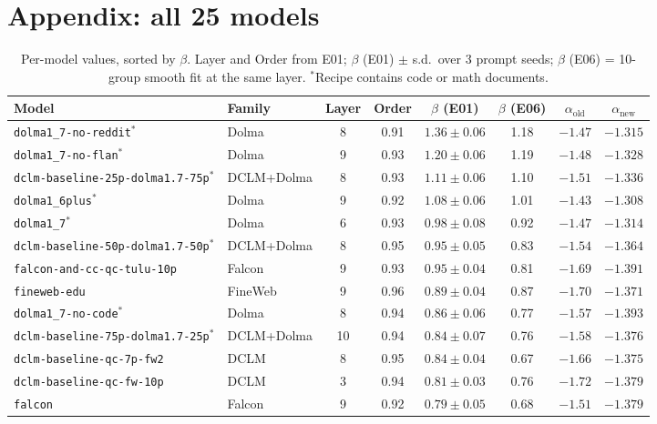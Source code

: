\documentclass[11pt]{article}
\newcommand{\aold}{\alpha_{\text{old}}}
\newcommand{\anew}{\alpha_{\text{new}}}
\begin{document}
\clearpage
\section*{Appendix: all 25 models}

\begin{table}[h]
\centering\footnotesize
\caption{Per-model values, sorted by $\beta$. Layer and Order from E01; $\beta$ (E01) $\pm$ s.d.\ over
3 prompt seeds; $\beta$ (E06) = 10-group smooth fit at the same layer. $^{*}$Recipe contains code or
math documents.}
\label{tab:all}
\begin{tabular}{@{}llcc ccc c@{}}
\toprule
Model & Family & Layer & Order & $\beta$ (E01) & $\beta$ (E06) & $\aold$ & $\anew$ \\
\midrule
\texttt{dolma1\_7-no-reddit$^{*}$} & Dolma & 8 & 0.91 & $1.36\pm0.06$ & 1.18 & $-1.47$ & $-1.315$ \\
\texttt{dolma1\_7-no-flan$^{*}$} & Dolma & 9 & 0.93 & $1.20\pm0.06$ & 1.19 & $-1.48$ & $-1.328$ \\
\texttt{dclm-baseline-25p-dolma1.7-75p$^{*}$} & DCLM+Dolma & 8 & 0.93 & $1.11\pm0.06$ & 1.10 & $-1.51$ & $-1.336$ \\
\texttt{dolma1\_6plus$^{*}$} & Dolma & 9 & 0.92 & $1.08\pm0.06$ & 1.01 & $-1.43$ & $-1.308$ \\
\texttt{dolma1\_7$^{*}$} & Dolma & 6 & 0.93 & $0.98\pm0.08$ & 0.92 & $-1.47$ & $-1.314$ \\
\texttt{dclm-baseline-50p-dolma1.7-50p$^{*}$} & DCLM+Dolma & 8 & 0.95 & $0.95\pm0.05$ & 0.83 & $-1.54$ & $-1.364$ \\
\texttt{falcon-and-cc-qc-tulu-10p} & Falcon & 9 & 0.93 & $0.95\pm0.04$ & 0.81 & $-1.69$ & $-1.391$ \\
\texttt{fineweb-edu} & FineWeb & 9 & 0.96 & $0.89\pm0.04$ & 0.87 & $-1.70$ & $-1.371$ \\
\texttt{dolma1\_7-no-code$^{*}$} & Dolma & 8 & 0.94 & $0.86\pm0.06$ & 0.77 & $-1.57$ & $-1.393$ \\
\texttt{dclm-baseline-75p-dolma1.7-25p$^{*}$} & DCLM+Dolma & 10 & 0.94 & $0.84\pm0.07$ & 0.76 & $-1.58$ & $-1.376$ \\
\texttt{dclm-baseline-qc-7p-fw2} & DCLM & 8 & 0.95 & $0.84\pm0.04$ & 0.67 & $-1.66$ & $-1.375$ \\
\texttt{dclm-baseline-qc-fw-10p} & DCLM & 3 & 0.94 & $0.81\pm0.03$ & 0.76 & $-1.72$ & $-1.379$ \\
\texttt{falcon} & Falcon & 9 & 0.92 & $0.79\pm0.05$ & 0.68 & $-1.51$ & $-1.379$ \\

\end{tabular}
\end{table}
\end{document}
